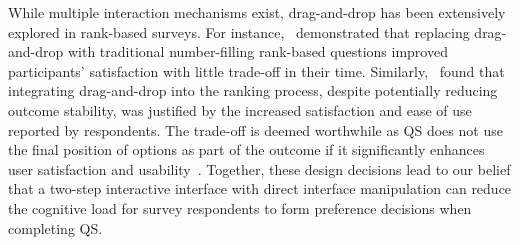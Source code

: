 While multiple interaction mechanisms exist, drag-and-drop has been extensively explored in rank-based surveys. For instance,~\textcite{krosnick2018measurement} demonstrated that replacing drag-and-drop with traditional number-filling rank-based questions improved participants' satisfaction with little trade-off in their time. Similarly,~\textcite{timbrook2013comparison} found that integrating drag-and-drop into the ranking process, despite potentially reducing outcome stability, was justified by the increased satisfaction and ease of use reported by respondents. The trade-off is deemed worthwhile as QS does not use the final position of options as part of the outcome if it significantly enhances user satisfaction and usability~\cite{rintoulVisualAnimatedResponse}.
Together, these design decisions lead to our belief that a two-step interactive interface with direct interface manipulation can reduce the cognitive load for survey respondents to form preference decisions when completing QS.

